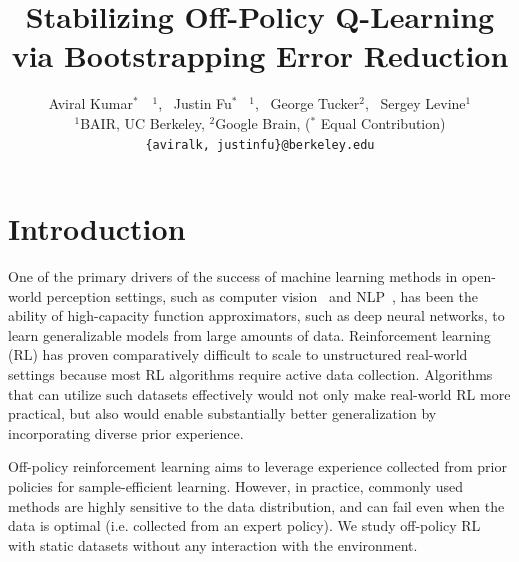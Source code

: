 \documentclass{article}
\title{Stabilizing Off-Policy Q-Learning via Bootstrapping Error Reduction}
\author{%
    Aviral Kumar$^*$~~$^1$,~ Justin Fu$^*$ ~$^1$,~ George Tucker$^2$,~ Sergey Levine$^1$\\
    $^1$BAIR, UC Berkeley, $^2$Google Brain, ($^*$ Equal Contribution)\\
    \texttt{\{aviralk, justinfu\}@berkeley.edu}
}
\begin{document}

\maketitle

\vspace{-40pt}
\section{Introduction}
\vspace{-10pt}
One of the primary drivers of the success of machine learning methods in open-world perception settings, such as computer vision~\cite{he2016resnet} and NLP~\cite{devlin2018bert}, has been the ability of high-capacity function approximators, such as deep neural networks, to learn generalizable models from large amounts of data. Reinforcement learning (RL) has proven comparatively difficult to scale to unstructured real-world settings because most RL algorithms require active data collection. Algorithms that can utilize such datasets effectively would not only make real-world RL more practical, but also would enable substantially better generalization by incorporating diverse prior experience.  

Off-policy reinforcement learning aims to leverage experience collected from prior policies for sample-efficient learning. However, in practice, commonly used methods are highly sensitive to the data distribution, and can fail even when the data is optimal (i.e. collected from an expert policy). We study off-policy RL with static datasets without any interaction with the environment.
\end{document}
